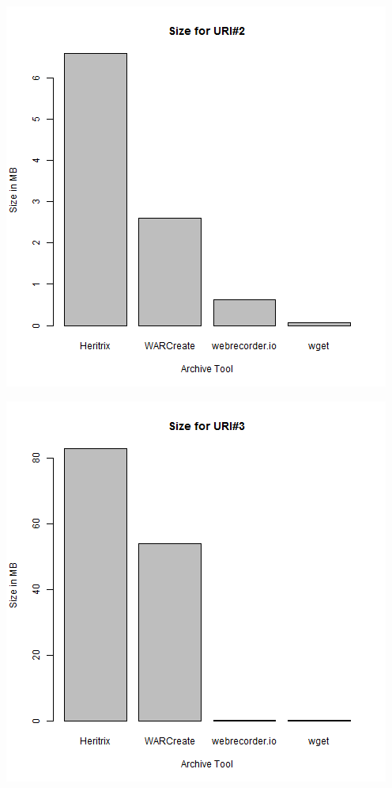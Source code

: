 \begin{itemize}
\begin{minipage}{\linewidth}
		\label{sizeURI1}
	\end{minipage}
	\begin{minipage}{\linewidth}
		\centering
		\includegraphics[scale=0.55]{figures/uri2.png}
		\label{sizeURI2}
	\end{minipage}
	\newpage
	\begin{minipage}{\linewidth}
		\centering
		\includegraphics[scale=0.55]{figures/uri3.png}
		\label{sizeURI3}
	\end{minipage}
\end{itemize}

